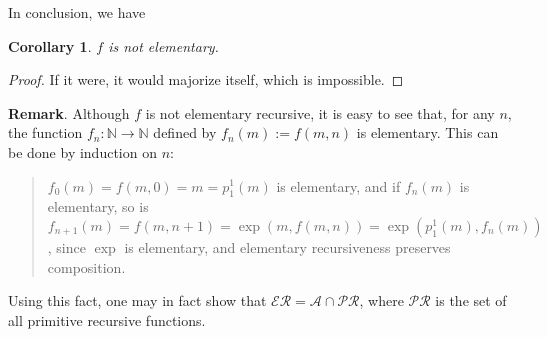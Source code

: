 \documentclass[12pt]{article}
\newtheorem{cor}{Corollary}
\begin{document}
In conclusion, we have
\begin{cor} $f$ is not elementary. \end{cor}
\begin{proof}  If it were, it would majorize itself, which is impossible. \end{proof}

\textbf{Remark}.  Although $f$ is not elementary recursive, it is easy to see that, for any $n$, the function $f_n: \mathbb{N}\to \mathbb{N}$ defined by $f_n(m):=f(m,n)$ is elementary.  This can be done by induction on $n$: 
\begin{quote}
$f_0(m)=f(m,0)=m = p_1^1(m)$ is elementary, and if $f_n(m)$ is elementary, so is $f_{n+1}(m)=f(m,n+1)=\exp(m,f(m,n))=\exp(p_1^1(m),f_n(m))$, since $\exp$ is elementary, and elementary recursiveness preserves composition.  
\end{quote}
Using this fact, one may in fact show that $\mathcal{ER}=\mathcal{A}\cap \mathcal{PR}$, where $\mathcal{PR}$ is the set of all primitive recursive functions.
\end{document}
